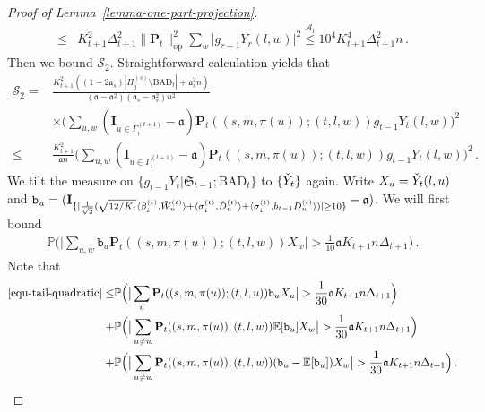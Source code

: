 \documentclass[11pt]{article}
\numberwithin{equation}{section}
\begin{document}
\begin{proof}[Proof of Lemma~\ref{lemma-one-part-projection}]
\begin{align}
    \leq & K_{t+1}^2 \Delta_{t+1}^2 \| \mathbf{P}_t \|^2_{\mathrm{op}} \sum_{w} \big| g_{r-1} Y_r(l,w) \big|^2 \overset{\mathcal{A}_t}{\leq} 10^4 K_{t+1}^4 \Delta_{t+1}^2 n \,. \label{equ-bound-proj-v=u}
\end{align}
Then we bound $\mathcal{S}_2$. Straightforward calculation yields that
\begin{align*}
    \mathcal S_2
    =& \frac{  K_{t+1}^2 ((1-2\mathfrak{a}_s) |\Pi^{(s)}_j \setminus \mathrm{BAD}_{t}| +\mathfrak{a}_s^2 n)} {(\mathfrak{a}-\mathfrak{a}^2) (\mathfrak{a}_s-\mathfrak{a}_s^2)n^2}  \\
    &\times  \Big( \sum_{u,w} ( \mathbf{I}_{u \in \Gamma^{(t+1)}_i} -\mathfrak{a})  \mathbf{P}_t((s,m,\pi(u));(t,l,w)) g_{t-1} Y_t(l,w) \Big)^2  \\
    \leq & \frac{ K_{t+1}^2 }{\mathfrak{a} n} \Big( \sum_{u,w}  ( \mathbf{I}_{u \in \Gamma^{(t+1)}_i} -\mathfrak{a} )  \mathbf{P}_t((s,m,\pi(u));(t,l,w)) g_{t-1} Y_t(l,w) \Big)^2 \,. 
\end{align*}
We tilt the measure on $\{ g_{t-1} Y_t | \mathfrak{S}_{t-1}; \mathrm{BAD}_t \}$ to $\{ \Check{Y}_t  \}$ again. Write $X_u = \Check{Y}_t(l,u) $ and $\mathtt{b}_u =  ( \mathbf{I}_{ \{ | \frac{1}{\sqrt{2}} ( \sqrt{12/K_t} \langle \beta^{(t)}_i, \Tilde{W}^{(t)}_u \rangle +  \langle \sigma^{(t)}_i, \Check{D}^{(t)}_u \rangle + \langle \sigma^{(t)}_i, b_{t-1}{D}^{(t)}_u \rangle ) | \geq 10 \}} -\mathfrak{a} )$. We will first bound
\begin{align}
    \mathbb{P} \Big( \big| \sum_{u,w} \mathtt{b}_u \mathbf{P}_t((s,m,\pi(u));(t,l,w)) X_w \big| > \frac{1}{10} \mathfrak{a} K_{t+1} n \Delta_{t+1} \Big) \,.  \label{equ-tail-quadratic}
\end{align}
Note that
\begin{align}
    \eqref{equ-tail-quadratic} \leq & \mathbb{P} \Big( \big| \sum_{u} \mathbf{P}_t((s,m,\pi(u));(t,l,u)) \mathtt{b}_u X_u \big| > \frac{1}{30} \mathfrak{a} K_{t+1} n \Delta_{t+1} \Big) \label{equ-tail-quadratic-part-I} \\
    + & \mathbb{P} \Big( \big| \sum_{u \neq w} \mathbf{P}_t((s,m,\pi(u));(t,l,w)) \mathbb{E}[\mathtt{b}_u] X_w \big| > \frac{1}{30} \mathfrak{a} K_{t+1} n \Delta_{t+1} \Big) \label{equ-tail-quadratic-part-II} \\
    + & \mathbb{P} \Big( \big| \sum_{u \neq w} \mathbf{P}_t((s,m,\pi(u));(t,l,w)) (\mathtt{b}_u - \mathbb{E}[\mathtt{b}_u] ) X_w \big| > \frac{1}{30} \mathfrak{a} K_{t+1} n \Delta_{t+1} \Big) \label{equ-tail-quadratic-part-III} \,.
\end{align}

\end{proof}
\end{document}
